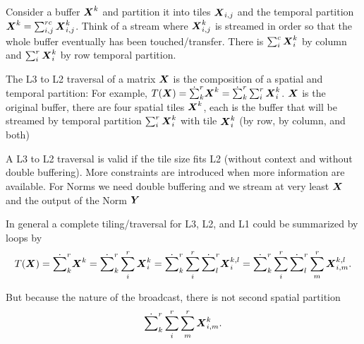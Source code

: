\documentclass[acmsmall]{acmart}
\begin{document}
\begin{definition}
  Consider a buffer ${\boldsymbol X}^k$ and partition it into tiles
  ${\boldsymbol X}_{i,j}$ and the temporal partition ${\boldsymbol X}^k =
  \sum_{i,j}^{rc}{\boldsymbol X}^k_{i,j}$. Think of a stream where
  ${\boldsymbol X}^k_{i,j}$ is streamed in order so that the whole buffer
  eventually has been touched/transfer. There is
  $\sum_{i}^c{\boldsymbol X}^k_{i}$ by column and $\sum_{i}^r{\boldsymbol X}^k_{i}$ by
  row temporal partition.
\end{definition}


\begin{definition}
  The L3 to L2 traversal of a matrix ${\boldsymbol X}$ is the composition of a
  spatial and temporal partition: For example, $T({\boldsymbol X}) =
  \dot\sum_k^r {\boldsymbol X}^k = \dot\sum_k^r\sum_{i}^{r}{\boldsymbol X}^k_{i}$.
  ${\boldsymbol X}$ is the original buffer, there are four spatial tiles
  ${\boldsymbol X}^k$, each is the buffer that will be streamed by temporal
  partition $\sum_{i}^r{\boldsymbol X}^k_{i}$ with tile ${\boldsymbol X}^k_{i}$ (by row, by column,  and both)
\end{definition}


A L3 to L2 traversal is valid if the tile size fits L2 (without
context and without double buffering). More constraints are introduced
when more information are available. For Norms we need double
buffering and we stream at very least ${\boldsymbol X}$ and the output of the
Norm ${\boldsymbol Y}$


In general a complete tiling/traversal for L3, L2, and L1 could be
summarized by loops by
\begin{equation}
T({\boldsymbol X}) = \dot\sum_k^r {\boldsymbol X}^k =
\dot\sum_k^r\sum_{i}^{r}{\boldsymbol X}^k_{i} =
\dot\sum_k^r\sum_{i}^{r}\dot\sum_l^r{\boldsymbol X}^{k,l}_{i} =
\dot\sum_k^r\sum_{i}^r\dot\sum_l^r\sum_{m}^r{\boldsymbol X}^{k,l}_{i,m}.
\end{equation}

But because the nature of the broadcast, there is not second spatial
partition
\begin{equation}
\dot\sum_k^r\sum_{i}^r\sum_{m}^r{\boldsymbol X}^{k}_{i,m}.
\end{equation}
\end{document}
